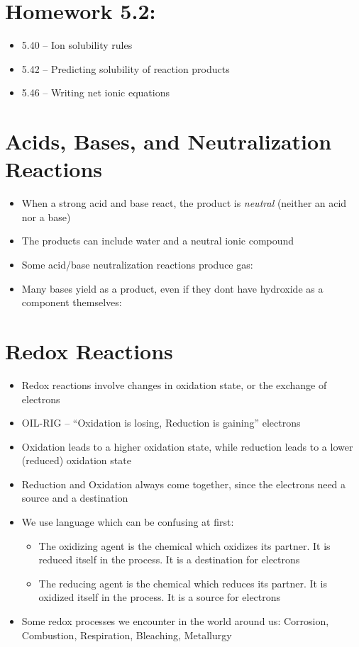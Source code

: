 \documentclass[12pt, openany, letterpaper]{memoir}
\begin{document}
\section*{Homework 5.2:}
\begin{itemize}
	\item 5.40 -- Ion solubility rules
	\item 5.42 -- Predicting solubility of reaction products
	\item 5.46 -- Writing net ionic equations
\end{itemize}

\section{Acids, Bases, and Neutralization Reactions}
\begin{itemize}
	\item When a strong acid and base react, the product is \emph{neutral} (neither an acid nor a base)
	\item The products can include water and a neutral ionic compound
	\item Some acid/base neutralization reactions produce gas: 
	\item Many bases yield  as a product, even if they dont have hydroxide as a component themselves: 
\end{itemize}

\section{Redox Reactions}
\begin{itemize}
	\item Redox reactions involve changes in oxidation state, or the exchange of electrons
	\item OIL-RIG -- ``Oxidation is losing, Reduction is gaining'' electrons
	\item Oxidation leads to a higher oxidation state, while reduction leads to a lower (reduced) oxidation state
	\item Reduction and Oxidation always come together, since the electrons need a source and a destination
	\item We use language which can be confusing at first:
	      \begin{itemize}
		      \item The oxidizing agent is the chemical which oxidizes its partner. It is reduced itself in the process. It is a destination for electrons
		      \item The reducing agent is the chemical which reduces its partner. It is oxidized itself in the process. It is a source for electrons
	      \end{itemize}
	\item Some redox processes we encounter in the world around us: Corrosion, Combustion, Respiration, Bleaching, Metallurgy
\end{itemize}
\end{document}

